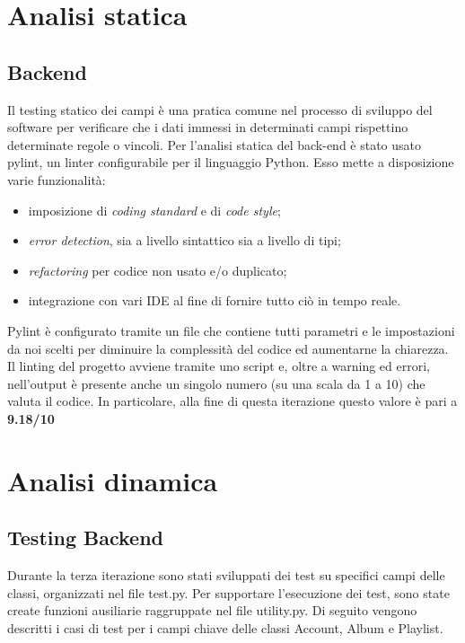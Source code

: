 \newpage
\section{Analisi statica}
\vspace{2pt}
\subsection{Backend}
Il testing statico dei campi è una pratica comune nel processo di sviluppo del software 
per verificare che i dati immessi in determinati campi rispettino determinate regole o vincoli. 
Per l'analisi statica del back-end è stato usato pylint, un linter configurabile per il 
linguaggio Python. Esso mette a disposizione varie funzionalità:
\begin{itemize}
    \item imposizione di \textit{coding standard} e di \textit{code style};
    \item \textit{error detection}, sia a livello sintattico sia a livello di tipi;
    \item \textit{refactoring} per codice non usato e/o duplicato;
    \item integrazione con vari IDE al fine di fornire tutto ciò in tempo reale. 
\end{itemize}
Pylint è configurato tramite un file che contiene tutti parametri e le impostazioni 
da noi scelti per diminuire la complessità del codice ed aumentarne la chiarezza.
Il linting del progetto avviene tramite uno script e, oltre a warning ed errori, 
nell'output è presente anche un singolo numero (su una scala da 1 a 10) che valuta il codice. 
In particolare, alla fine di questa iterazione questo valore è pari a \textbf{9.18/10}


\newpage
\section{Analisi dinamica}
\vspace{2pt}
\subsection{Testing Backend}
Durante la terza iterazione sono stati sviluppati dei test su specifici campi delle classi, organizzati nel file test.py. Per supportare l'esecuzione 
dei test, sono state create funzioni ausiliarie raggruppate nel file utility.py.
Di seguito vengono descritti i casi di test per i campi chiave delle classi Account, Album e Playlist.

